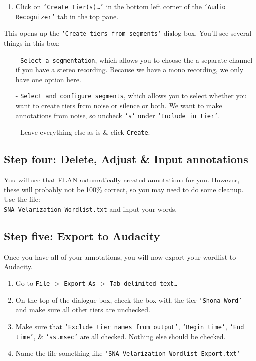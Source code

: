 \documentclass[letterpaper,12pt]{article}
\begin{document}
\begin{enumerate}
\item Click on \texttt{`Create Tier(s)\ldots'} in the bottom left corner of the \texttt{`Audio Recognizer'} tab in the top pane.
\end{enumerate}
This opens up the \texttt{`Create tiers from segments'} dialog box. You'll see several things in this box:
\begin{itemize}
\item[-] \texttt{Select a segmentation}, which allows you to choose the a separate channel if you have a stereo recording. Because we have a mono recording, we only have one option here. 
\item[-] \texttt{Select and configure segments}, which allows you to select whether you want to create tiers from noise or silence or both. We want to make annotations from noise, so uncheck \texttt{`s'} under \texttt{`Include in tier'}.
\item[-] Leave everything else as is \& click \texttt{Create}.
\end{itemize}

\subsection*{Step four: Delete, Adjust \& Input annotations}
You will see that ELAN automatically created annotations for you. However, these will probably not be 100\% correct, so you may need to do some cleanup. Use the file:\\ \texttt{SNA-Velarization-Wordlist.txt} and input your words. 

\subsection*{Step five: Export to Audacity}
Once you have all of your annotations, you will now export your wordlist to Audacity. 
\begin{enumerate}
  \item Go to \texttt{File} $>$ \texttt{Export As}  $>$ \texttt{Tab-delimited text\dots}
  \item On the top of the dialogue box, check the box with the tier \texttt{`Shona Word'} and make sure all other tiers are unchecked.
  \item Make sure that \texttt{`Exclude tier names from output'}, \texttt{`Begin time'}, \texttt{`End time'}, \& \texttt{`ss.msec'} are all checked. Nothing else should be checked.
  \item Name the file something like \texttt{`SNA-Velarization-Wordlist-Export.txt'}
\end{enumerate}
\end{document}
